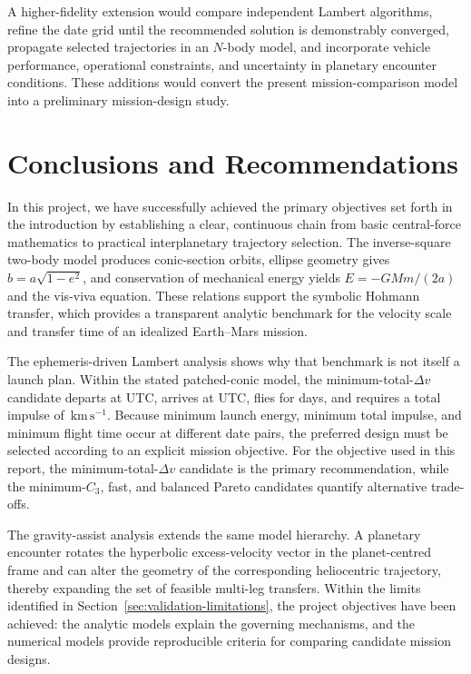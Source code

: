 \documentclass[11pt,a4paper]{article}
\newcommand{\kms}{\ensuremath{\,\mathrm{km\,s^{-1}}}}
\begin{document}
A higher-fidelity extension would compare independent Lambert algorithms,
refine the date grid until the recommended solution is demonstrably converged,
propagate selected trajectories in an $N$-body model, and incorporate vehicle
performance, operational constraints, and uncertainty in planetary encounter
conditions. These additions would convert the present mission-comparison model
into a preliminary mission-design study.

\section{Conclusions and Recommendations}
\label{sec:conclusions}

In this project, we have successfully achieved the primary objectives set forth in the introduction by establishing a clear, continuous chain from basic central-force mathematics to practical interplanetary trajectory selection. The inverse-square two-body model produces
conic-section orbits, ellipse geometry gives $b=a\sqrt{1-e^2}$, and conservation
of mechanical energy yields $E=-GMm/(2a)$ and the vis-viva equation. These
relations support the symbolic Hohmann transfer, which provides a transparent
analytic benchmark for the velocity scale and transfer time of an idealized
Earth--Mars mission.

The ephemeris-driven Lambert analysis shows why that benchmark is not itself a
launch plan. Within the stated patched-conic model, the minimum-total-$\Delta v$
candidate departs at \MinimumDeparture{} UTC, arrives at \MinimumArrival{} UTC,
flies for \MinimumTOF{} days, and requires a total impulse of
\MinimumTotalDV\kms{}. Because minimum launch energy, minimum total impulse,
and minimum flight time occur at different date pairs, the preferred design
must be selected according to an explicit mission objective. For the objective
used in this report, the minimum-total-$\Delta v$ candidate is the primary
recommendation, while the minimum-$C_3$, fast, and balanced Pareto candidates
quantify alternative trade-offs.

The gravity-assist analysis extends the same model hierarchy. A planetary
encounter rotates the hyperbolic excess-velocity vector in the planet-centred
frame and can alter the geometry of the corresponding heliocentric trajectory,
thereby expanding the set of feasible multi-leg transfers. Within the limits
identified in Section~\ref{sec:validation-limitations}, the project objectives
have been achieved: the analytic models explain the governing mechanisms, and
the numerical models provide reproducible criteria for comparing candidate
mission designs.
\end{document}

